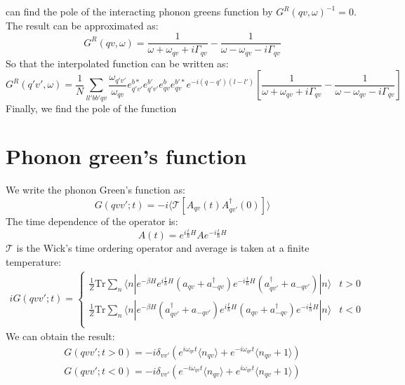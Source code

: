 \documentclass{article}
\begin{document}
can find the pole of the interacting phonon greens function by $G^R(qv, \omega)^{-1} = 0$. The 
result can be approximated as:
\begin{equation}
    G^R(qv, \omega) = \frac{1}{\omega + \omega_{qv} + i\Gamma_{qv}} - \frac{1}{\omega - \omega_{qv} - i\Gamma_{qv}}
\end{equation}
So that the interpolated function can be written as:
\begin{equation}
    G^R(q'v',\omega) = \frac{1}{N}  \sum_{ll'bb'qv} \frac{ \omega_{q'v'}}{\omega_{qv}}
    e^{b*}_{q'v'}e_{q'v'}^{b'} e_{qv}^b e_{qv}^{b'*} e^{-i(q-q')(l-l')} 
    \left[ \frac{1}{\omega + \omega_{qv} + i\Gamma_{qv}} - \frac{1}{\omega - \omega_{qv} - i\Gamma_{qv}} \right]
\end{equation}
Finally, we find the pole of the function

\section{Phonon green's function} 
We write the phonon Green's function as:
\begin{equation}
    G(qvv';t) = -i \langle \mathcal{T}[A_{qv}(t)A_{qv'}^{\dagger}(0)] \rangle \label{green_phonon}
\end{equation}
The time dependence of the operator is:
\begin{equation}
    A(t) = e^{i\frac{t}{\hbar}H} A e^{-i\frac{t}{\hbar}H}
\end{equation}
$\mathcal{T}$ is the Wick's time ordering operator and average is taken at a finite temperature:
\begin{align}
    iG(qvv';t) = 
    \begin{cases} 
        \frac{1}{Z} \text{Tr} \sum_n \langle n | e^{-\beta H} e^{i\frac{t}{\hbar}H} (a_{qv} + a^{\dagger}_{-qv}) e^{-i\frac{t}{\hbar}H} (a^{\dagger}_{qv'} + a_{-qv'}) | n \rangle & t > 0 \\
        \frac{1}{Z} \text{Tr} \sum_n \langle n | e^{-\beta H} (a^{\dagger}_{qv'} + a_{-qv'}) e^{i\frac{t}{\hbar}H} (a_{qv} + a^{\dagger}_{-qv}) e^{-i\frac{t}{\hbar}H} | n \rangle & t < 0 \\
    \end{cases}
\end{align}
We can obtain the result:
\begin{align}
    G(qvv';t > 0) = -i \delta_{vv'}  ( e^{i\omega_{qv}t}\langle n_{qv} \rangle + e^{-i\omega_{qv}t}\langle n_{qv}+1 \rangle ) \\
    G(qvv';t < 0) = -i \delta_{vv'}  ( e^{-i\omega_{qv}t}\langle n_{qv} \rangle + e^{i\omega_{qv}t}\langle n_{qv}+1 \rangle )
\end{align}
\end{document}
